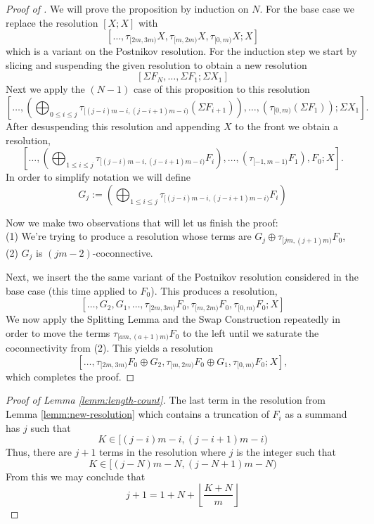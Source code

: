 \begin{proof}[Proof of ]
  We will prove the proposition by induction on $N$.
  For the base case we replace the resolution $[X;X]$ with
  $$[\dots, \tau_{[2m,3m)}X, \tau_{[m,2m)}X, \tau_{[0,m)}X; X]$$
  which is a variant on the Postnikov resolution.
  For the induction step we start by slicing and suspending the given resolution to obtain a new resolution
  $$ [\Sigma F_N, \dots, \Sigma F_1; \Sigma X_1] $$
  Next we apply the $(N-1)$ case of this proposition to this resolution
  $$ \left[ \dots, \left( \bigoplus_{0 \leq i \leq j} \tau_{[(j-i)m-i,(j-i+1)m-i)}(\Sigma F_{i+1}) \right) , \dots , \left( \tau_{[0,m)} (\Sigma F_1) \right) ; \Sigma X_1 \right]. $$
  After desuspending this resolution and appending $X$ to the front we obtain a resolution,
  $$ \left[ \dots, \left( \bigoplus_{1 \leq i \leq j} \tau_{[(j-i)m-i,(j-i+1)m-i)} F_i \right) , \dots , \left( \tau_{[-1,m-1)} F_1 \right), F_0 ; X \right]. $$
  In order to simplify notation we will define
  $$ G_j := \left( \bigoplus_{1 \leq i \leq j} \tau_{[(j-i)m-i,(j-i+1)m-i)} F_i \right) $$
    
  Now we make two observations that will let us finish the proof:\\
  \noindent (1) We're trying to produce a resolution whose terms are $G_j \oplus \tau_{[jm,(j+1)m)}F_0$,\\
  \noindent (2) $G_j$ is $(jm-2)$-coconnective.

  Next, we insert the the same variant of the Postnikov resolution considered in the base case (this time applied to $F_0$). This produces a resolution,
  $$ [\dots, G_2, G_1, \dots, \tau_{[2m,3m)}F_0, \tau_{[m,2m)}F_0, \tau_{[0,m)}F_0; X]$$  
  We now apply the Splitting Lemma and the Swap Construction repeatedly in order to move the terms $\tau_{[am,(a+1)m)}F_0$ to the left until we saturate the coconnectivity from (2). This yields a resolution
  $$ [\dots, \tau_{[2m,3m)}F_0 \oplus G_2, \tau_{[m,2m)}F_0 \oplus G_1, \tau_{[0,m)}F_0; X], $$
  which completes the proof.
\end{proof}

\begin{proof}[Proof of Lemma \ref{lemm:length-count}]
  The last term in the resolution from Lemma \ref{lemm:new-resolution} which contains a truncation of $F_i$ as a summand has $j$ such that
  $$ K \in [(j-i)m-i, (j-i+1)m - i) $$
  Thus, there are $j+1$ terms in the resolution where $j$ is the integer such that
  $$ K \in [(j-N)m-N, (j-N+1)m - N) $$
 From this we may conclude that
 $$ j+1 = 1 + N + \left\lfloor \frac{K+N}{m} \right\rfloor $$
\end{proof}

